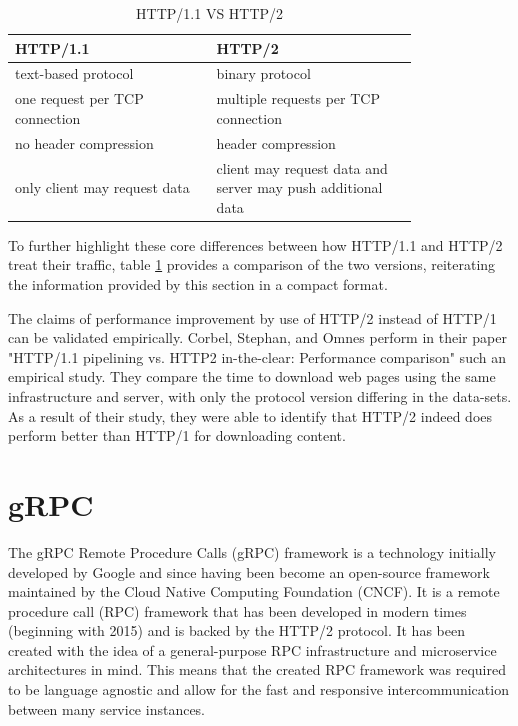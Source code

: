 \documentclass[conference]{IEEEtran}
\begin{document}
\begin{table}[!htbp]
	\centering
	\caption{HTTP/1.1 VS HTTP/2}
	\label{http2comparison}
	\begin{tabular}{| p{0.4\linewidth} | p{0.4\linewidth}|}\hline
		HTTP/1.1 & HTTP/2 \\\hline
		text-based protocol & binary protocol \\\hline
		one request per TCP connection & multiple requests per TCP connection \\\hline
		no header compression & header compression \\\hline
		only client may request data & client may request data and server may push additional data \\\hline
	\end{tabular}
\end{table}

To further highlight these core differences between how HTTP/1.1 and HTTP/2 treat their traffic, table \ref{http2comparison} provides a comparison of the two versions, reiterating the information provided by this section in a compact format.

The claims of performance improvement by use of HTTP/2 instead of HTTP/1 can be validated empirically. Corbel, Stephan, and Omnes perform in their paper "HTTP/1.1 pipelining vs. HTTP2 in-the-clear: Performance comparison" \cite{7745823} such an empirical study. They compare the time to download web pages using the same infrastructure and server, with only the protocol version differing in the data-sets. As a result of their study, they were able to identify that HTTP/2 indeed does perform better than HTTP/1 for downloading content.

\section{gRPC}
\label{sec:grpc}

The gRPC Remote Procedure Calls (gRPC) framework \cite{GRPCAuthors2020} is a technology initially developed by Google and since having been become an open-source framework maintained by the Cloud Native Computing Foundation (CNCF). It is a remote procedure call (RPC) framework that has been developed in modern times (beginning with 2015) and is backed by the HTTP/2 protocol. It has been created with the idea of a general-purpose RPC infrastructure and microservice architectures in mind. This means that the created RPC framework was required to be language agnostic and allow for the fast and responsive intercommunication between many service instances.
\end{document}
